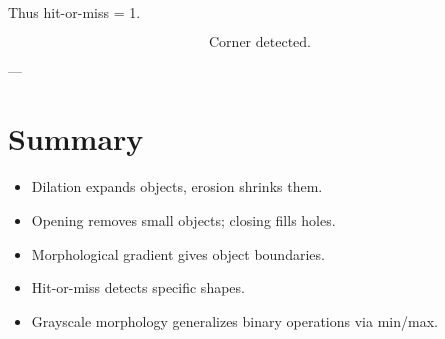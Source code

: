 \documentclass{AnantDocumentation}
\begin{document}
Thus hit-or-miss = 1.

\[
\boxed{\text{Corner detected.}}
\]

---

\section*{Summary}

\begin{itemize}
\item Dilation expands objects, erosion shrinks them.
\item Opening removes small objects; closing fills holes.
\item Morphological gradient gives object boundaries.
\item Hit-or-miss detects specific shapes.
\item Grayscale morphology generalizes binary operations via min/max.
\end{itemize}
\end{document}
